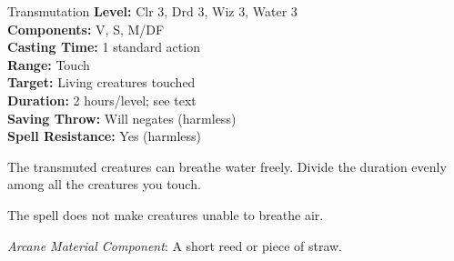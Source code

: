 {Transmutation}
{
	\textbf{Level:}
	Clr 3, Drd 3, Wiz 3, Water 3\\
	\textbf{Components:}
	V, S, M/DF\\
	\textbf{Casting Time:}
	1 standard action\\
	\textbf{Range:}
	Touch\\
	\textbf{Target:}
	Living creatures touched\\
	\textbf{Duration:}
	2 hours/level; see text\\
	\textbf{Saving Throw:}
	Will negates (harmless)\\
	\textbf{Spell Resistance:}
	Yes (harmless)\\
}
{
	The transmuted creatures can breathe water freely. Divide the duration evenly among all the creatures you touch.

	The spell does not make creatures unable to breathe air.

	\textit{Arcane Material Component}:
	A short reed or piece of straw.

}
